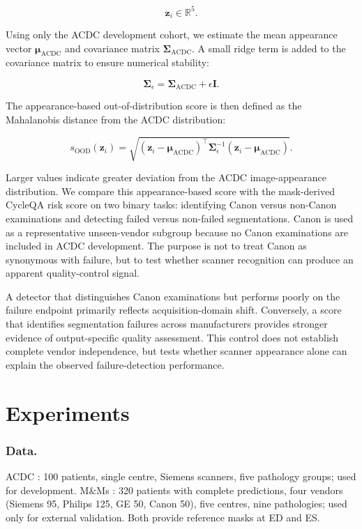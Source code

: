 \documentclass[runningheads]{llncs}
\newcommand{\CQ}{CycleQA}
\begin{document}
\begin{equation}
\mathbf{z}_i\in\mathbb{R}^{5}.
\end{equation}

Using only the ACDC development cohort, we estimate the mean appearance vector $\boldsymbol{\mu}_{\mathrm{ACDC}}$ and covariance matrix $\boldsymbol{\Sigma}_{\mathrm{ACDC}}$. A small ridge term is added to the covariance matrix to ensure numerical stability:

\begin{equation}
\boldsymbol{\Sigma}_{\epsilon}
=
\boldsymbol{\Sigma}_{\mathrm{ACDC}}
+
\epsilon\mathbf{I}.
\end{equation}

The appearance-based out-of-distribution score is then defined as the Mahalanobis distance from the ACDC distribution:

\begin{equation}
s_{\mathrm{OOD}}(\mathbf{z}_i)
=
\sqrt{
(\mathbf{z}_i-\boldsymbol{\mu}_{\mathrm{ACDC}})^{\top}
\boldsymbol{\Sigma}_{\epsilon}^{-1}
(\mathbf{z}_i-\boldsymbol{\mu}_{\mathrm{ACDC}})
}.
\end{equation}

Larger values indicate greater deviation from the ACDC image-appearance distribution. We compare this appearance-based score with the mask-derived \CQ{} risk score on two binary tasks: identifying Canon versus non-Canon examinations and detecting failed versus non-failed segmentations. Canon is used as a representative unseen-vendor subgroup because no Canon examinations are included in ACDC development. The purpose is not to treat Canon as synonymous with failure, but to test whether scanner recognition can produce an apparent quality-control signal.

A detector that distinguishes Canon examinations but performs poorly on the failure endpoint primarily reflects acquisition-domain shift. Conversely, a score that identifies segmentation failures across manufacturers provides stronger evidence of output-specific quality assessment. This control does not establish complete vendor independence, but tests whether scanner appearance alone can explain the observed failure-detection performance.



\section{Experiments}

\subsubsection{Data.} ACDC \cite{bernard2018acdc}: 100 patients, single centre, Siemens
scanners, five pathology groups; used for development. M\&Ms \cite{campello2021mnms}: 320
patients with complete predictions, four vendors (Siemens 95, Philips 125, GE 50, Canon 50), five centres, nine pathologies; used only for external validation. Both provide reference masks at ED and ES.
\end{document}
